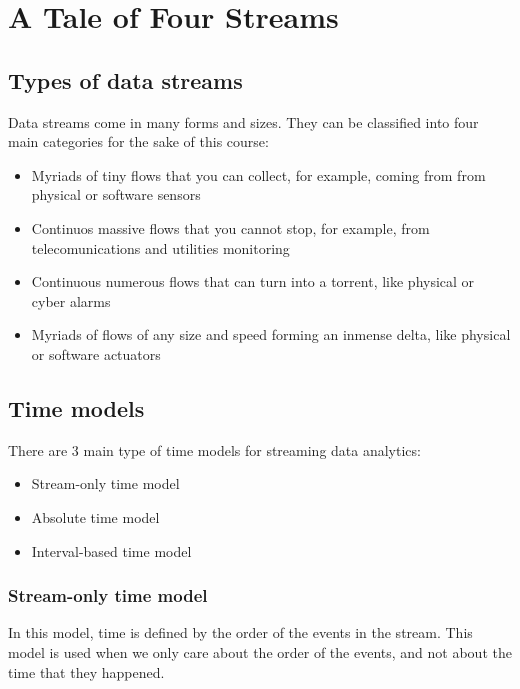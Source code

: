 \chapter{A Tale of Four Streams}

\section{Types of data streams}

Data streams come in many forms and sizes. They can be classified into four main 
categories for the sake of this course:

\begin{itemize}
    \item Myriads of tiny flows that you can collect, for example, coming from
    from physical or software sensors

    \item Continuos massive flows that you cannot stop, for example, from 
    telecomunications and utilities monitoring
    
    \item Continuous numerous flows that can turn into a torrent, like physical or cyber
    alarms

    \item Myriads of flows of any size and speed forming an inmense delta, like physical or
    software actuators
\end{itemize}

\section{Time models}

There are 3 main type of time models for streaming data analytics:

\begin{itemize}
    \item Stream-only time model
    \item Absolute time model
    \item Interval-based time model
\end{itemize}

\subsection{Stream-only time model}

In this model, time is defined by the order of the events in the stream. This model
is used when we only care about the order of the events, and not about the time that
they happened.\\

